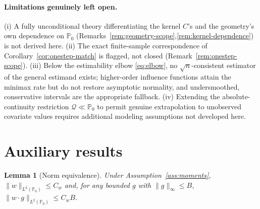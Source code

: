 \documentclass[11pt]{article}
\theoremstyle{plain}
\newtheorem{lemma}[theorem]{Lemma}
\theoremstyle{definition}
\theoremstyle{remark}
\newcommand{\PP}{\mathbb{P}}
\newcommand{\Q}{\mathcal{Q}}
\begin{document}
\paragraph{Limitations genuinely left open.} (i) A fully unconditional theory
differentiating the kernel $C$'s and the geometry's own dependence on $\PP_0$
(Remarks~\ref{rem:geometry-scope},\ref{rem:kernel-dependence}) is not derived here.
(ii) The exact finite-sample correspondence of Corollary~\ref{cor:onestep-match} is
flagged, not closed (Remark~\ref{rem:onestep-scope}). (iii) Below the estimability
elbow \eqref{eq:elbow}, no $\sqrt n$-consistent estimator of the general estimand
exists; higher-order influence functions attain the minimax rate but do not restore
asymptotic normality, and undersmoothed, conservative intervals are the appropriate
fallback. (iv) Extending the absolute-continuity restriction $\Q\ll\PP_0$ to permit
genuine extrapolation to unobserved covariate values requires additional modeling
assumptions not developed here.

\appendix
\renewcommand{\thesection}{\Alph{section}}
\section{Auxiliary results}\label{app:aux}

\begin{lemma}[Norm equivalence]\label{lem:normequiv}
Under Assumption~\ref{ass:moments}, $\|w\|_{L^2(\PP_0)}\le C_w$ and, for any bounded
$g$ with $\|g\|_\infty\le B$, $\|w\cdot g\|_{L^2(\PP_0)}\le C_w B$.
\end{lemma}
\end{document}
